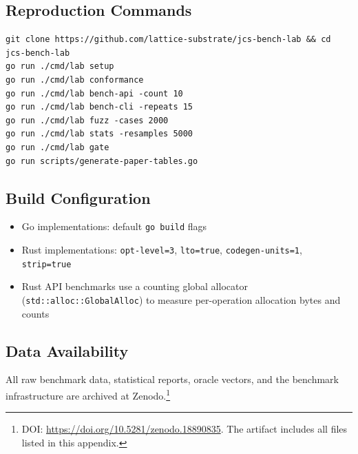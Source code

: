 \subsection*{Reproduction Commands}

\begin{verbatim}
git clone https://github.com/lattice-substrate/jcs-bench-lab && cd jcs-bench-lab
go run ./cmd/lab setup
go run ./cmd/lab conformance
go run ./cmd/lab bench-api -count 10
go run ./cmd/lab bench-cli -repeats 15
go run ./cmd/lab fuzz -cases 2000
go run ./cmd/lab stats -resamples 5000
go run ./cmd/lab gate
go run scripts/generate-paper-tables.go
\end{verbatim}

\subsection*{Build Configuration}

\begin{itemize}
\item Go implementations: default \texttt{go build} flags
\item Rust implementations: \texttt{opt-level=3}, \texttt{lto=true},
      \texttt{codegen-units=1}, \texttt{strip=true}
\item Rust API benchmarks use a counting global allocator
      (\texttt{std::alloc::GlobalAlloc}) to measure per-operation
      allocation bytes and counts
\end{itemize}

\subsection*{Data Availability}

All raw benchmark data, statistical reports, oracle vectors, and the
benchmark infrastructure are archived at
Zenodo.\footnote{DOI: \url{https://doi.org/10.5281/zenodo.18890835}.
The artifact includes all files listed in this appendix.}
